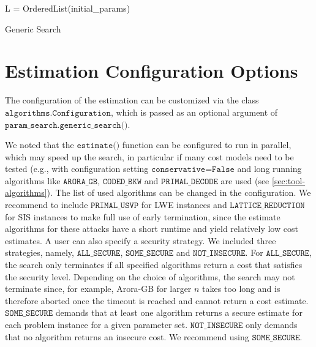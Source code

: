 \begin{algorithm2e} %

    L = OrderedList(initial\_params)\\
    \caption{Generic Search} \label{alg:generic-search}
\end{algorithm2e}


\section{Estimation Configuration Options}\label{sec:config-options}
The configuration of the estimation can be customized via the class $\texttt{algorithms.Configuration}$, which is passed as an optional argument of $\texttt{param\_search.generic\_search()}$.

We noted that the $\texttt{estimate()}$ function can be configured to run in parallel, which may speed up the search, in particular if many cost models need to be tested (e.g., with configuration setting $\texttt{conservative=False}$ and long running algorithms like $\texttt{ARORA\_GB}$, $\texttt{CODED\_BKW}$ and $\texttt{PRIMAL\_DECODE}$ are used (see \cref{sec:tool-algorithms}). The list of used algorithms can be changed in the configuration. We recommend to include $\texttt{PRIMAL\_USVP}$ for LWE instances and $\texttt{LATTICE\_REDUCTION}$ for SIS instances to make full use of early termination, since the estimate algorithms for these attacks have a short runtime and yield relatively low cost estimates. A user can also specify a security strategy. We included three strategies, namely, $\texttt{ALL\_SECURE}$, $\texttt{SOME\_SECURE}$ and $\texttt{NOT\_INSECURE}$. For $\texttt{ALL\_SECURE}$, the search only terminates if all specified algorithms return a cost that satisfies the security level. Depending on the choice of algorithms, the search may not terminate since, for example, Arora-GB for larger $n$ takes too long and is therefore aborted once the timeout is reached and cannot return a cost estimate. $\texttt{SOME\_SECURE}$ demands that at least one algorithm returns a secure estimate for each problem instance for a given parameter set. $\texttt{NOT\_INSECURE}$ only demands that no algorithm returns an insecure cost. We recommend using $\texttt{SOME\_SECURE}$.


